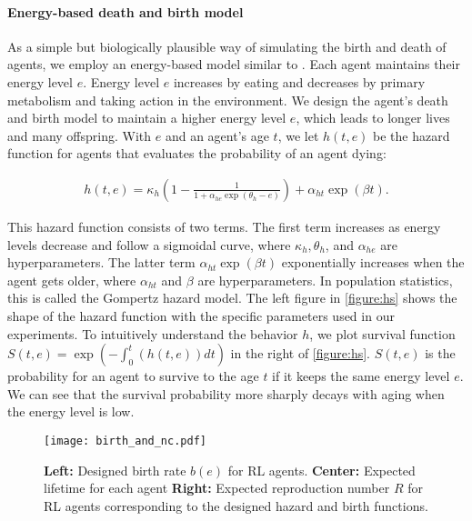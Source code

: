 \paragraph{Energy-based death and birth model}
As a simple but biologically plausible way of simulating the birth and death of agents, we employ an energy-based model similar to \citet{hamonEcoevolutionaryDynamicsNonepisodic2023}. Each agent maintains their energy level $e$. Energy level $e$ increases by eating and decreases by primary metabolism and taking action in the environment. We design the agent's death and birth model to maintain a higher energy level $e$, which leads to longer lives and many offspring. With $e$ and an agent's age $t$, we let $h(t, e)$ be the hazard function for agents that evaluates the probability of an agent dying:

\begin{align}
  h(t, e) = \kappa_{h} \left(1 - \frac{1}{1 + \alpha_{he} \exp(\theta_{h} - e)} \right) + \alpha_{ht} \exp(\beta t). \label{eq:h}
\end{align}

This hazard function\label{eq:h} consists of two terms. The first term increases as energy levels decrease and follow a sigmoidal curve, where $\kappa_{h}, \theta_{h}$, and $\alpha_{he}$ are hyperparameters. The latter term $\alpha_{ht} \exp(\beta t)$ exponentially increases when the agent gets older, where $\alpha_{ht}$ and $\beta$ are hyperparameters. In population statistics, this is called the Gompertz hazard model\citep{gompertzXXIVNatureFunction1825,kirkwoodDecipheringDeathCommentary2015}. The left figure in \cref{figure:hs} shows the shape of the hazard function with the specific parameters used in our experiments. To intuitively understand the behavior $h$, we plot survival function $S(t, e) = \exp (-\int_{0}^{t}(h(t, e)) dt)$ in the right of \cref{figure:hs}. $S(t, e)$ is the probability for an agent to survive to the age $t$ if it keeps the same energy level $e$. We can see that the survival probability more sharply decays with aging when the energy level is low.

\begin{figure}[t]
  \centering{}
  \texttt{[image: birth\_and\_nc.pdf]}
  \caption{
    \textbf{Left:} Designed birth rate $b(e)$ for RL agents.
    \textbf{Center:} Expected lifetime for each agent
    \textbf{Right:} Expected reproduction number $R$ for RL agents corresponding to the designed hazard and birth functions.
  }\label{figure:bnc}
\end{figure}

